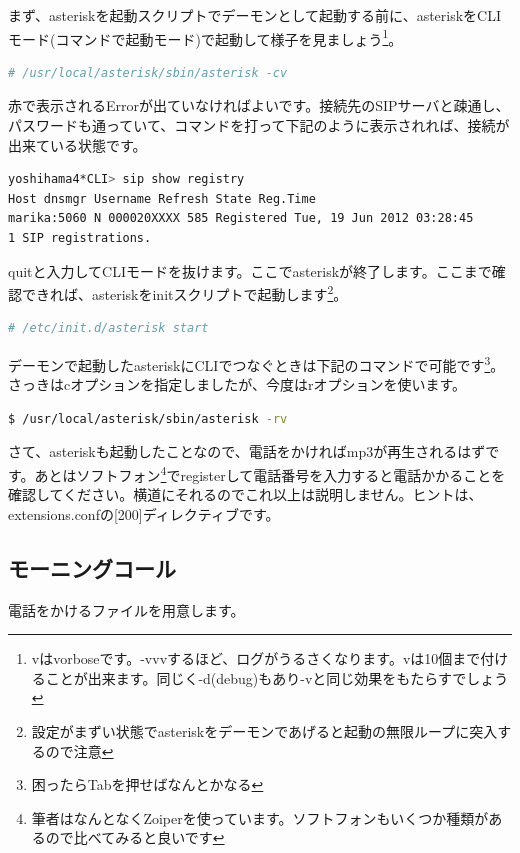まず、asteriskを起動スクリプトでデーモンとして起動する前に、asteriskをCLIモード(コマンドで起動モード)で起動して様子を見ましょう\footnote{vはvorboseです。-vvvするほど、ログがうるさくなります。vは10個まで付けることが出来ます。同じく-d(debug)もあり-vと同じ効果をもたらすでしょう}。

\begin{lstlisting}[language=bash]
# /usr/local/asterisk/sbin/asterisk -cv
\end{lstlisting}

赤で表示されるErrorが出ていなければよいです。接続先のSIPサーバと疎通し、パスワードも通っていて、コマンドを打って下記のように表示されれば、接続が出来ている状態です。

\begin{lstlisting}[language=bash]
yoshihama4*CLI> sip show registry 
Host dnsmgr Username Refresh State Reg.Time 
marika:5060 N 000020XXXX 585 Registered Tue, 19 Jun 2012 03:28:45
1 SIP registrations. 
\end{lstlisting}

quitと入力してCLIモードを抜けます。ここでasteriskが終了します。ここまで確認できれば、asteriskをinitスクリプトで起動します\footnote{設定がまずい状態でasteriskをデーモンであげると起動の無限ループに突入するので注意}。

\begin{lstlisting}[language=bash]
# /etc/init.d/asterisk start
\end{lstlisting}

デーモンで起動したasteriskにCLIでつなぐときは下記のコマンドで可能です\footnote{困ったらTabを押せばなんとかなる}。さっきはcオプションを指定しましたが、今度はrオプションを使います。

\begin{lstlisting}[language=bash]
$ /usr/local/asterisk/sbin/asterisk -rv
\end{lstlisting}

さて、asteriskも起動したことなので、電話をかければmp3が再生されるはずです。あとはソフトフォン\footnote{筆者はなんとなくZoiperを使っています。ソフトフォンもいくつか種類があるので比べてみると良いです}でregisterして電話番号を入力すると電話かかることを確認してください。横道にそれるのでこれ以上は説明しません。ヒントは、extensions.confの[200]ディレクティブです。

\subsection{モーニングコール}
電話をかけるファイルを用意します。

